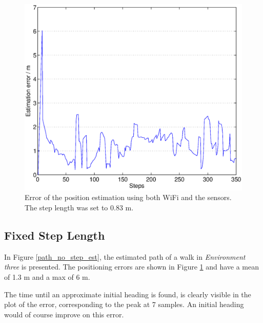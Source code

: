 \documentclass{LTHthesis}
\begin{document}
%
\begin{figure}[!hbt]

\includegraphics[width=1\textwidth ]{images/sensor_fused/error_no_step_est}
\caption{Error of the position estimation using both WiFi and the sensors. The step length was set to 0.83 m.}\label{error_no_step_est}
\end{figure}
%

%
\subsection{Fixed Step Length}
In Figure \ref{path_no_step_est}, the estimated path of a walk in \emph{Environment three} is presented. The positioning errors are shown in Figure \ref{error_no_step_est} and have a mean of 1.3 m and a max of 6 m. 
%

The time until an approximate initial heading is found, is clearly visible in the plot of the error, corresponding to the peak at 7 samples. An initial heading would of course improve on this error. 
\end{document}
